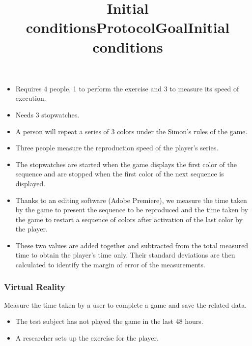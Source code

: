\documentclass[12pt, openany, twocolumn]{article}
\begin{document}
            \noindent \title{\textbf{Initial conditions}}
                \begin{itemize}
                \renewcommand\labelitemi{--}
                    \item{Requires 4 people, 1 to perform the exercise and 3 to measure its speed of execution.}
                    \item{Needs 3 stopwatches.}
                \end{itemize}

            \noindent \title{\textbf{Protocol}}
                \begin{itemize}
                \renewcommand\labelitemi{--}
                    \item{A person will repeat a series of 3 colors under the Simon's rules of the game.}
                    \item{Three people measure the reproduction speed of the player's series.}
                    \item{The stopwatches are started when the game displays the first color of the sequence and are stopped when the first color of the next sequence is displayed.}
                    \item{Thanks to an editing software (Adobe Premiere), we measure the time taken by the game to present the sequence to be reproduced and the time taken by the game to restart a sequence of colors after activation of the last color by the player.}
                    \item{These two values are added together and subtracted from the total measured time to obtain the player's time only. Their standard deviations are then calculated to identify the margin of error of the measurements.}
                \end{itemize}
                
        \subsubsection{Virtual Reality}
            \title{\textbf{Goal}} \vspace{0.25cm}

            \noindent Measure the time taken by a user to complete a game and save the related data.
            \\

            \noindent \title{\textbf{Initial conditions}}
                \begin{itemize}
                \renewcommand\labelitemi{--}
                    \item{The test subject has not played the game in the last 48 hours.}
                    \item{A researcher sets up the exercise for the player.}
                \end{itemize}
\end{document}
